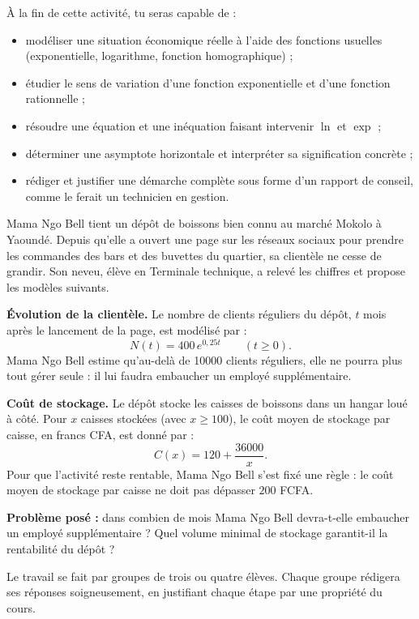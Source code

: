 \documentclass[11pt]{article}
\newcommand{\cle}[1]{{\popxbold\color{popdark}#1}}
\newcounter{popsec}
\newcounter{popsub}
\newcommand{\courssub}[1]{%
  \stepcounter{popsub}%
  \par\vspace{9pt}\noindent{\popxbold\fontsize{11.5}{13}\selectfont\color{popink}{\color{poporange}\thepopsec.\thepopsub}\hspace{6pt}#1}\par\nopagebreak\vspace{4pt}
}
\begin{document}
À la fin de cette activité, tu seras capable de :
\begin{itemize}
\item \cle{modéliser} une situation économique réelle à l'aide des fonctions usuelles (exponentielle, logarithme, fonction homographique) ;
\item étudier le \cle{sens de variation} d'une fonction exponentielle et d'une fonction rationnelle ;
\item résoudre une \cle{équation} et une \cle{inéquation} faisant intervenir $\ln$ et $\exp$ ;
\item déterminer une \cle{asymptote horizontale} et interpréter sa signification concrète ;
\item \cle{rédiger et justifier} une démarche complète sous forme d'un rapport de conseil, comme le ferait un technicien en gestion.
\end{itemize}

\courssub{Situation}

Mama Ngo Bell tient un dépôt de boissons bien connu au marché Mokolo à Yaoundé. Depuis qu'elle a ouvert une page sur les réseaux sociaux pour prendre les commandes des bars et des buvettes du quartier, sa clientèle ne cesse de grandir. Son neveu, élève en Terminale technique, a relevé les chiffres et propose les modèles suivants.

\textbf{Évolution de la clientèle.} Le nombre de clients réguliers du dépôt, $t$ mois après le lancement de la page, est modélisé par :
\[ N(t) = 400\,e^{0{,}25t} \qquad (t \geq 0). \]
Mama Ngo Bell estime qu'au-delà de \num{10000} clients réguliers, elle ne pourra plus tout gérer seule : il lui faudra embaucher un employé supplémentaire.

\textbf{Coût de stockage.} Le dépôt stocke les caisses de boissons dans un hangar loué à côté. Pour $x$ caisses stockées (avec $x \geq 100$), le coût moyen de stockage par caisse, en francs CFA, est donné par :
\[ C(x) = 120 + \frac{36000}{x}. \]
Pour que l'activité reste rentable, Mama Ngo Bell s'est fixé une règle : le coût moyen de stockage par caisse ne doit pas dépasser $200$ FCFA.

\textbf{Problème posé :} dans combien de mois Mama Ngo Bell devra-t-elle embaucher un employé supplémentaire ? Quel volume minimal de stockage garantit-il la rentabilité du dépôt ?

\courssub{Consignes}

Le travail se fait par groupes de trois ou quatre élèves. Chaque groupe rédigera ses réponses soigneusement, en justifiant chaque étape par une propriété du cours.
\end{document}
